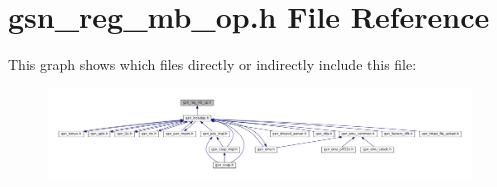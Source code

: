\hypertarget{a00561}{
\section{gsn\_\-reg\_\-mb\_\-op.h File Reference}
\label{a00561}
}
This graph shows which files directly or indirectly include this file:
\nopagebreak
\begin{figure}[H]
\begin{center}
\leavevmode
\includegraphics[width=400pt]{a00797}
\end{center}
\end{figure}
